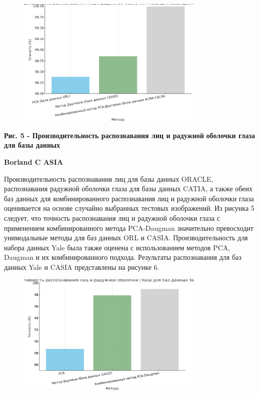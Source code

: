 \begin{figure}[H]
	\centering
	\includegraphics[width=0.8\textwidth]{assets/87}
	\caption*{}
\end{figure}

\textbf{Рис. 5 - Производительность распознавания лиц и радужной}
\textbf{оболочки глаза для базы данных}

\textbf{Borland C ASIA}

Производительность распознавания лиц для базы данных ORACLE,
распознавания радужной оболочки глаза для базы данных CATIA, а также
обеих баз данных для комбинированного распознавания лиц и радужной
оболочки глаза оценивается на основе случайно выбранных тестовых
изображений. Из рисунка 5 следует, что точность распознавания лиц и
радужной оболочки глаза с применением комбинированного метода
PCA-Daugman значительно превосходит унимодальные методы для баз данных
ORL и CASIA. Производительность для набора данных Yale была также
оценена с использованием методов PCA, Daugman и их комбинированного
подхода. Результаты распознавания для баз данных Yale и CASIA
представлены на рисунке 6.

\begin{figure}[H]
	\centering
	\includegraphics[width=0.8\textwidth]{assets/88}
	\caption*{}
\end{figure}

